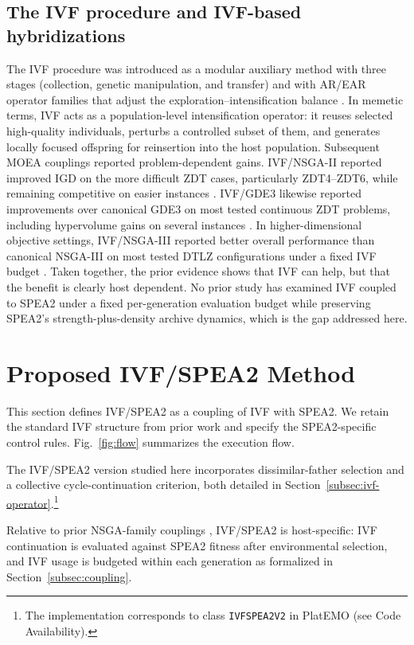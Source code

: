 \documentclass[pdflatex,sn-mathphys-ay]{sn-jnl}%
\theoremstyle{thmstyleone}%
\theoremstyle{thmstyletwo}%
\theoremstyle{thmstylethree}%
\begin{document}
\subsection{The IVF procedure and IVF-based hybridizations}\label{subsec:rw-ivf}
The IVF procedure was introduced as a modular auxiliary method with three stages (collection, genetic manipulation, and transfer) and with AR/EAR operator families that adjust the exploration--intensification balance \citep{camilo-junior2011}. In memetic terms, IVF acts as a population-level intensification operator: it reuses selected high-quality individuals, perturbs a controlled subset of them, and generates locally focused offspring for reinsertion into the host population. Subsequent MOEA couplings reported problem-dependent gains. IVF/NSGA-II reported improved IGD on the more difficult ZDT cases, particularly ZDT4--ZDT6, while remaining competitive on easier instances \citep{sampaio2017ivf}. IVF/GDE3 likewise reported improvements over canonical GDE3 on most tested continuous ZDT problems, including hypervolume gains on several instances \citep{sampaio2019ivf}. In higher-dimensional objective settings, IVF/NSGA-III reported better overall performance than canonical NSGA-III on most tested DTLZ configurations under a fixed IVF budget \citep{Sampaio2024}. Taken together, the prior evidence shows that IVF can help, but that the benefit is clearly host dependent. No prior study has examined IVF coupled to SPEA2 under a fixed per-generation evaluation budget while preserving SPEA2's strength-plus-density archive dynamics, which is the gap addressed here.


\section{Proposed IVF/SPEA2 Method}\label{sec:method}

This section defines IVF/SPEA2 as a coupling of IVF with SPEA2. We retain the standard IVF structure from prior work \citep{camilo-junior2011, sampaio2017ivf, sampaio2019ivf, Sampaio2024} and specify the SPEA2-specific control rules. Fig.~\ref{fig:flow} summarizes the execution flow.

The IVF/SPEA2 version studied here incorporates dissimilar-father selection and a collective cycle-continuation criterion, both detailed in Section~\ref{subsec:ivf-operator}.\footnote{The implementation corresponds to class \texttt{IVFSPEA2V2} in PlatEMO (see Code Availability).}

Relative to prior NSGA-family couplings \citep{sampaio2017ivf, Sampaio2024}, IVF/SPEA2 is host-specific: IVF continuation is evaluated against SPEA2 fitness after environmental selection, and IVF usage is budgeted within each generation as formalized in Section~\ref{subsec:coupling}.
\end{document}
